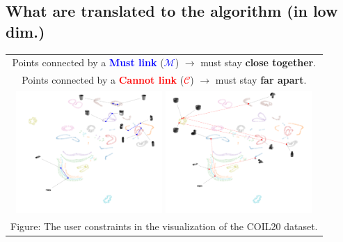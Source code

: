 \documentclass[portrait,final,a0paper]{nadiposter}
\begin{document}
\begin{poster}
{\begin{multicols}{2}
    \section*{\large{What are translated to the algorithm (in low dim.)}}
    \begin{center}
    \begin{tabular}{c}
        Points connected by a \textcolor{blue}{\textbf{Must link}} (\textcolor{blue}{$\mathcal{M}$}) $\rightarrow$ must stay \textbf{close together}.\\
        Points connected by a \textcolor{red}{\textbf{Cannot link}} (\textcolor{red}{$\mathcal{C}$}) $\rightarrow$ must stay \textbf{far apart}.\\
        \includegraphics[height=12.5em]{poster_NADI_2018/images/example_constrains_COIL20_ML.pdf}
        \includegraphics[height=12.5em]{poster_NADI_2018/images/example_constrains_COIL20_CL.pdf}\\
        \tiny{Figure: The user constraints in the visualization of the COIL20 dataset.}
    \end{tabular}
    \end{center}
\end{multicols}
}


\end{poster}
\end{document}
